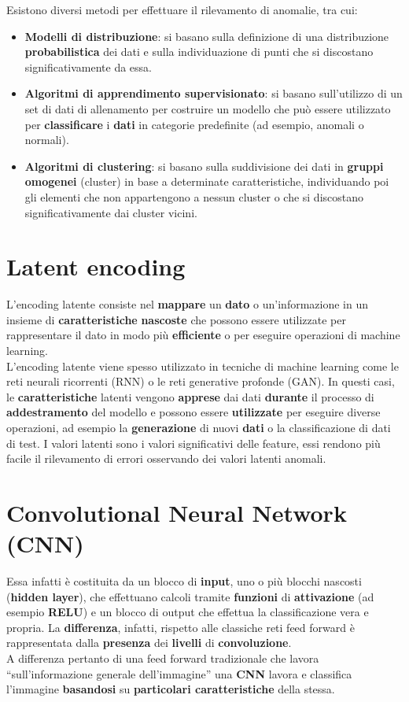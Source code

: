 \documentclass{article}
\begin{document}
Esistono diversi metodi per effettuare il rilevamento di anomalie, tra cui:
\begin{itemize}
    \item \textbf{Modelli di distribuzione}: si basano sulla definizione di una distribuzione \textbf{probabilistica} dei dati e sulla individuazione di punti che si discostano significativamente da essa.
    \item \textbf{Algoritmi di apprendimento supervisionato}: si basano sull'utilizzo di un set di dati di allenamento per costruire un modello che può essere utilizzato per \textbf{classificare} i \textbf{dati} in categorie predefinite (ad esempio, anomali o normali).
    \item \textbf{Algoritmi di clustering}: si basano sulla suddivisione dei dati in \textbf{gruppi} \textbf{omogenei} (cluster) in base a determinate caratteristiche, individuando poi gli elementi che non appartengono a nessun cluster o che si discostano significativamente dai cluster vicini.
\end{itemize}






\section{Latent encoding}
L'encoding latente consiste nel \textbf{mappare} un \textbf{dato} o un'informazione in un insieme di \textbf{caratteristiche} \textbf{nascoste} che possono essere utilizzate per rappresentare il dato in modo più \textbf{efficiente} o per eseguire operazioni di machine learning.
\\
L'encoding latente viene spesso utilizzato in tecniche di machine learning come le reti neurali ricorrenti (RNN) o le reti generative profonde (GAN). In questi casi, le \textbf{caratteristiche} latenti vengono \textbf{apprese} dai dati \textbf{durante} il processo di \textbf{addestramento} del modello e possono essere \textbf{utilizzate} per eseguire diverse operazioni, ad esempio la \textbf{generazione} di nuovi \textbf{dati} o la classificazione di dati di test.
I valori latenti sono i valori significativi delle feature, essi rendono più facile il rilevamento di errori osservando dei valori latenti anomali.

\section{Convolutional Neural Network (CNN)}
Essa infatti è costituita da  un blocco di \textbf{input}, uno o più blocchi nascosti (\textbf{hidden layer}), che effettuano calcoli tramite \textbf{funzioni} di \textbf{attivazione} (ad esempio \textbf{RELU})  e un blocco di output che effettua la classificazione vera e propria. La \textbf{differenza}, infatti,  rispetto alle classiche reti feed forward è rappresentata dalla \textbf{presenza} dei \textbf{livelli} di \textbf{convoluzione}.\\
A differenza pertanto di una feed forward tradizionale che lavora “sull’informazione generale dell’immagine”  una \textbf{CNN} lavora e classifica l’immagine \textbf{basandosi} su \textbf{particolari caratteristiche} della stessa.
\end{document}

